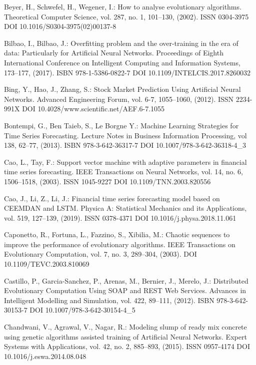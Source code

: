 \begin{thebibliography}{99.}
 Beyer, H., Schwefel, H., Wegener, I.: How to analyse evolutionary algorithms. Theoretical Computer Science, vol. 287, no. 1, 101--130, (2002). ISSN 0304-3975 DOI 10.1016/S0304-3975(02)00137-8

 Bilbao, I., Bilbao, J.: Overfitting problem and the over-training in the era of data: Particularly for Artificial Neural Networks. Proceedings of Eighth International Conference on Intelligent Computing and Information Systems, 173--177, (2017). ISBN 978-1-5386-0822-7 DOI 10.1109/INTELCIS.2017.8260032

 Bing, Y., Hao, J., Zhang, S.: Stock Market Prediction Using Artificial Neural Networks. Advanced Engineering Forum, vol. 6-7, 1055--1060, (2012). ISSN 2234-991X DOI 10.4028/www.scientific.net/AEF.6-7.1055

 Bontempi, G., Ben Taieb, S., Le Borgne Y.: Machine Learning Strategies for Time Series Forecasting. Lecture Notes in Business Information Processing, vol 138, 62--77, (2013). ISBN 978-3-642-36317-7 DOI 10.1007/978-3-642-36318-4\_3

 Cao, L., Tay, F.: Support vector machine with adaptive parameters in financial time series forecasting. IEEE Transactions on Neural Networks, vol. 14, no. 6, 1506--1518, (2003). ISSN 1045-9227 DOI 10.1109/TNN.2003.820556

 Cao, J., Li, Z., Li, J.: Financial time series forecasting model based on CEEMDAN and LSTM. Physica A: Statistical Mechanics and its Applications, vol. 519, 127--139, (2019). ISSN 0378-4371 DOI 10.1016/j.physa.2018.11.061

 Caponetto, R., Fortuna, L., Fazzino, S., Xibilia, M.: Chaotic sequences to improve the performance of evolutionary algorithms. IEEE Transactions on Evolutionary Computation, vol. 7, no. 3, 289--304, (2003). DOI 10.1109/TEVC.2003.810069

 Castillo, P., Garcia-Sanchez, P., Arenas, M., Bernier, J., Merelo, J.: Distributed Evolutionary Computation Using SOAP and REST Web Services. Advances in Intelligent Modelling and Simulation, vol. 422, 89--111, (2012). ISBN 978-3-642-30153-7 DOI 10.1007/978-3-642-30154-4\_5

 Chandwani, V., Agrawal, V., Nagar, R.: Modeling slump of ready mix concrete using genetic algorithms assisted training of Artificial Neural Networks. Expert Systems with Applications, vol. 42, no. 2, 885--893, (2015). ISSN 0957-4174 DOI 10.1016/j.eswa.2014.08.048


\end{thebibliography}
